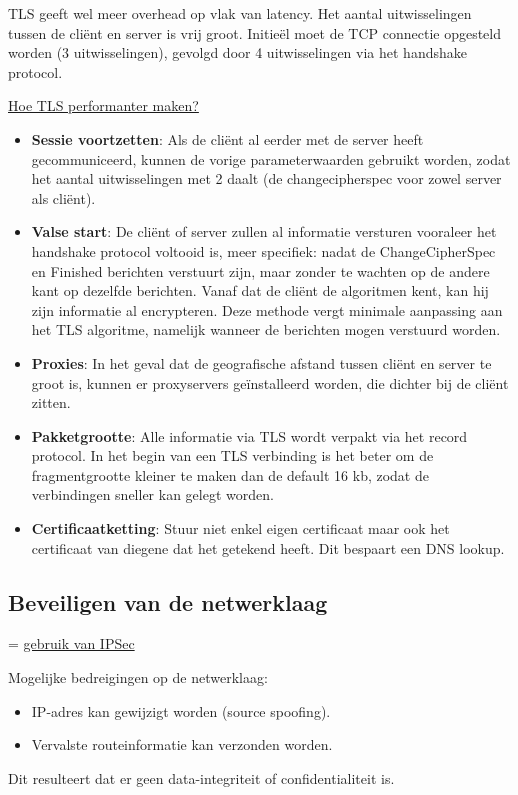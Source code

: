 \documentclass{report}
\begin{document}
	TLS geeft wel meer overhead op vlak van latency. Het aantal uitwisselingen tussen de cliënt en server is vrij groot. Initieël moet de TCP connectie opgesteld worden (3 uitwisselingen), gevolgd door 4 uitwisselingen via het handshake protocol.

	\underline{Hoe TLS performanter maken?}
	\begin{itemize}
		\item \textbf{Sessie voortzetten}: Als de cliënt al eerder met de server heeft gecommuniceerd, kunnen de vorige parameterwaarden gebruikt worden, zodat het aantal uitwisselingen met 2 daalt (de changecipherspec voor zowel server als cliënt).
		\item \textbf{Valse start}: De cliënt of server zullen al informatie versturen vooraleer het handshake protocol voltooid is, meer specifiek: nadat de ChangeCipherSpec en Finished berichten verstuurt zijn, maar zonder te wachten op de andere kant op dezelfde berichten. Vanaf dat de cliënt de algoritmen kent, kan hij zijn informatie al encrypteren. Deze methode vergt minimale aanpassing aan het TLS algoritme, namelijk wanneer de berichten mogen verstuurd worden.
		\item \textbf{Proxies}: In het geval dat de geografische afstand tussen cliënt en server te groot is, kunnen er proxyservers geïnstalleerd worden, die dichter bij de cliënt zitten. 
		\item \textbf{Pakketgrootte}: Alle informatie via TLS wordt verpakt via het record protocol. In het begin van een TLS verbinding is het beter om de fragmentgrootte kleiner te maken dan de default 16 kb, zodat de verbindingen sneller kan gelegt worden.
		\item \textbf{Certificaatketting}: Stuur niet enkel eigen certificaat maar ook het certificaat van diegene dat het getekend heeft. Dit bespaart een DNS lookup.
	\end{itemize}

	\subsection{Beveiligen van de netwerklaag}
	= \underline{gebruik van IPSec}

	Mogelijke bedreigingen op de netwerklaag:
	\begin{itemize}
		\item IP-adres kan gewijzigt worden (source spoofing).
		\item Vervalste routeinformatie kan verzonden worden.
	\end{itemize}
	Dit resulteert dat er geen data-integriteit of confidentialiteit is.
\end{document}
